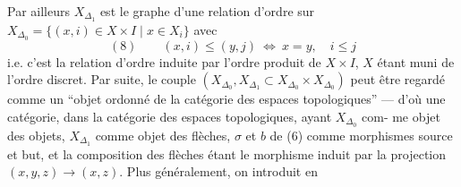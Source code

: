 Par ailleurs $X_{\Delta_1}$ est le graphe d'une relation
d'ordre sur $X_{\Delta_0}=\{(x,i)\in X\times I\mid x\in X_i\}$
avec
\[
(8)\qquad (x,i)\leq(y,j)\ \Longleftrightarrow\ x=y,\quad i\leq j
\]
i.e. c'est la relation d'ordre induite par
l'ordre produit de $X\times I$, $X$ étant muni
de l'ordre discret. Par suite, le
couple $(X_{\Delta_0},X_{\Delta_1}\subset X_{\Delta_0}\times X_{\Delta_0})$ peut
être regardé comme un ``objet ordonné de
la catégorie des espaces topologiques'' ---
d'où une catégorie, dans la catégorie
des espaces topologiques, ayant $X_{\Delta_0}$ com-
me objet des objets, $X_{\Delta_1}$ comme objet
des flèches, $\sigma$ et $b$ de (6) comme
morphismes source et but, et la
composition des flèches étant le
morphisme
induit par la projection $(x,y,z)\longrightarrow(x,z)$.
Plus généralement, on introduit en
